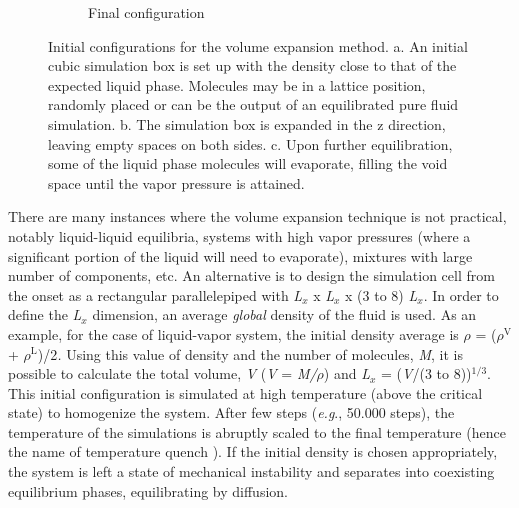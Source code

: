 \documentclass{scrbook}
\begin{document}
\begin{figure}
\begin{subfigure}{0.8\textwidth}
    \caption{Final configuration}
	\end{subfigure}
\caption{Initial configurations for the volume expansion method. a. An initial
cubic simulation box is set up with the density close to that of the expected
liquid phase. Molecules may be in a lattice position, randomly placed or can be
the output of an equilibrated pure fluid simulation. b. The simulation box is
expanded in the z direction, leaving empty spaces on both sides. c. Upon
further equilibration, some of the liquid phase molecules will evaporate,
filling the void space until the vapor pressure is attained.}
\label{fig:5}
\end{figure}

There are many instances where the volume expansion technique is not practical,
notably liquid-liquid equilibria, systems with high vapor pressures (where
a significant portion of the liquid will need to evaporate), mixtures with
large number of components, etc.  An alternative is to design the simulation
cell from the onset as a rectangular parallelepiped with \textit{L}$_{x}$
x \textit{L}$_{x}$ x (3 to 8) \textit{L}$_{x}$. In order to define the
\textit{L}$_{x}$ dimension, an average \textit{global} density of the fluid is
used. As an example, for the case of liquid-vapor system, the initial density
average is ${\rho}$ = (${\rho}$$^{\mathrm{V}}$
+ ${\rho}$$^{\mathrm{L}}$)/2\textit{.} Using this value of density and the
number of molecules, \textit{M}, it is possible to calculate the total volume,
\textit{V} (\textit{V} = \textit{M/${\rho}$}) and \textit{L}$_{x}$
= (\textit{V}/(3 to 8))$^{\mathrm{1/3}}$. This initial configuration is
simulated at high temperature (above the critical state) to homogenize the
system. After few steps (\textit{e.g}., 50.000 steps), the temperature of the
simulations is abruptly scaled to the final temperature (hence the name of
temperature quench \citep{martinez2005}).  If the initial
density is chosen appropriately, the system is left a state of mechanical
instability and separates into coexisting equilibrium phases, equilibrating by
diffusion.
\end{document}
